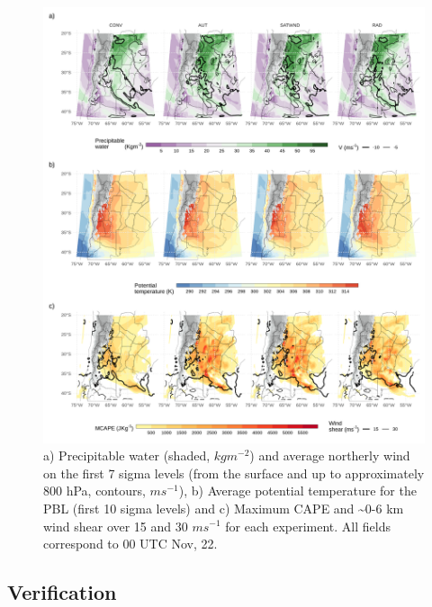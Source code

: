 \documentclass[final,5p,times,twocolumn,authoryear]{elsarticle} %
\begin{document}
\begin{figure}
\includegraphics[width=1\linewidth]{../figures/summary-fields-1} \caption{a) Precipitable water (shaded, \(kgm^{-2}\)) and average northerly wind on the first 7 sigma levels (from the surface and up to approximately 800 hPa, contours, \(ms^{-1}\)), b) Average potential temperature for the PBL (first 10 sigma levels) and c) Maximum CAPE and \textasciitilde0-6 km wind shear over 15 and 30 \(ms^{-1}\) for each experiment. All fields correspond to 00 UTC Nov, 22.}\label{fig:summary-fields}
\end{figure}

\hypertarget{verification}{%
\subsection{Verification}\label{verification}}
\end{document}
